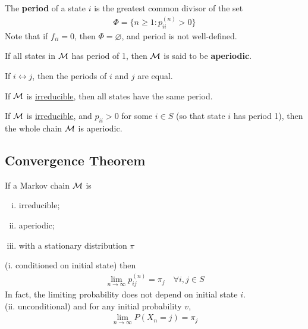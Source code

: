 \documentclass{article}
\newcommand{\upn}[0]{^{(n)}}
\begin{document}
	\begin{definition}
		The \textbf{period} of a state $i$ is the greatest common divisor of the set
		\begin{align}
			\Phi = \{n \geq 1: p_{ii}\upn > 0\}
		\end{align}
		Note that if $f_{ii} = 0$, then $\Phi = \varnothing$, and period is not well-defined.
	\end{definition}
	
	\begin{definition}
		If all states in $\mathcal{{M}}$ has period of 1, then $\mathcal{{M}}$ is said to be \textbf{aperiodic}.
	\end{definition}
	
	\begin{lemma}
		If $i \leftrightarrow j$, then the periods of $i$ and $j$ are equal.
	\end{lemma}
	
	\begin{corollary}
		If $\mathcal{{M}}$ is \ul{irreducible}, then all states have the same period.
	\end{corollary}
	
	\begin{corollary}
		If $\mathcal{{M}}$ is \ul{irreducible}, and $p_{ii} > 0$ for some $i \in S$ (so that state $i$ has period 1), then the whole chain $\mathcal{{M}}$ is aperiodic.
	\end{corollary}
	
	\subsection{Convergence Theorem}
	
	\begin{theorem}
		If a Markov chain $\mathcal{{M}}$ is 
		\begin{enumerate}[(i)]
			\item irreducible;
			\item aperiodic;
			\item with a stationary distribution $\pi$
		\end{enumerate}
		(i. conditioned on initial state) then
		\begin{align}
			\lim_{n \to \infty} p_{ij}\upn = \pi_j\quad\forall i, j \in S
		\end{align}
		In fact, the limiting probability does not depend on initial state $i$. \\
		(ii. unconditional) and for any initial probability $v$,
		\begin{align}
			\lim_{n \to \infty} P(X_n = j) = \pi_j
		\end{align}
	\end{theorem}
	
\end{document}
